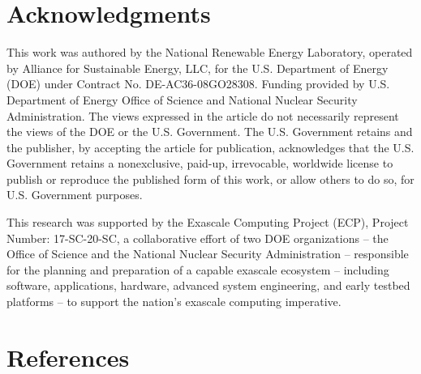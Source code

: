 \documentclass[review]{elsarticle}
\begin{document}
\section*{Acknowledgments}
This work was authored by the National Renewable Energy Laboratory, operated by Alliance for Sustainable Energy, LLC, for the U.S. Department of Energy (DOE) under Contract No. DE-AC36-08GO28308. Funding provided by U.S. Department of Energy Office of Science and National Nuclear Security Administration. The views expressed in the article do not necessarily represent the views of the DOE or the U.S. Government. The U.S. Government retains and the publisher, by accepting the article for publication, acknowledges that the U.S. Government retains a nonexclusive, paid-up, irrevocable, worldwide license to publish or reproduce the published form of this work, or allow others to do so, for U.S. Government purposes.

This research was supported by the Exascale Computing Project (ECP), Project Number: 17-SC-20-SC, a collaborative effort of two DOE organizations -- the Office of Science and the National Nuclear Security Administration -- responsible for the planning and preparation of a capable exascale ecosystem -- including software, applications, hardware, advanced system engineering, and early testbed platforms -- to support the nation's exascale computing imperative.

\section*{References}

\end{document}
